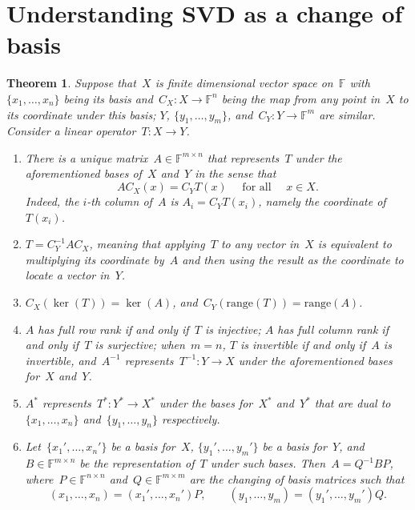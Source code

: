 \documentclass[11pt,a4paper]{article}
\newtheorem{theorem}{Theorem}%
\theoremstyle{definition}
\def\FF{\mathbb{F}}
\newcommand{\sss}[1]{{\scriptscriptstyle{#1}}}
\newcommand{\inv}{{-1}}
\newcommand{\adj}{*}
\newcommand{\range}{\mathrm{range}}
\begin{document}
\section{Understanding SVD as a change of basis}

\begin{theorem}
  \label{th:matrix}
  Suppose that~$X$ is finite dimensional vector space on~$\FF$ with $\{x_1,  \dots,
  x_n\}$ being its basis and~$C_\sss{X} : X \to \FF^{n}$ being the map from any point in~$X$ to its
  coordinate under this basis; $Y$, $\{y_1, \dots, y_m\}$, and~$C_\sss{Y} : Y \to \FF^{m}$ are similar. 
  Consider a linear operator~$T \mathrel{:} X \to Y$.
  \begin{enumerate}[leftmargin=1.5em]
    \item There is a unique matrix~$A\in \FF^{m\times n}$
   that represents~$T$ under the aforementioned bases of~$X$ and~$Y$ in the sense that 
  \begin{equation*}
    A C_\sss{X} (x) = C_\sss{Y} T (x) \quad \text{ for all } \quad x\in X.
  \end{equation*}
  Indeed, the $i$-th column of~$A$ is $A_i = C_\sss{Y}T(x_i)$, namely the coordinate of~$T(x_i)$. 
\item $T = C_\sss{Y}^\inv A C_\sss{X}$, meaning that applying~$T$ to any vector in~$X$ is equivalent to
  multiplying its coordinate by~$A$ and then using the result as the coordinate to locate a vector in~$Y$.  
\item $C_\sss{X}(\ker(T)) = \ker(A)$, and~$C_\sss{Y} (\range(T)) = \range(A)$.
\item $A$ has full row rank if and only if~$T$ is injective; $A$ has full column rank if and only
  if~$T$ is surjective;
  when~$m=n$, $T$ is invertible if and only if~$A$ is invertible, and~$A^\inv$
  represents~$T^\inv\mathrel{:} Y\to X$ under the aforementioned bases for~$X$ and~$Y$.
\item $A^\adj$ represents~$T^\adj \mathrel{:} Y^\adj \to X^\adj$ under the bases for~$X^*$ and~$Y^*$
  that are dual to~$\{x_1, \dots, x_n\}$ and~$\{y_1, \dots, y_n\}$ respectively.
\item Let~$\{x_1', \dots, x_n'\}$ be a basis for~$X$, $\{y_1', \dots, y_m'\}$ be a
  basis for~$Y$, and~$B\in \FF^{m\times n}$ be the representation of~$T$ under such bases.
  Then~$A = Q^\inv B P$, where~$P\in \FF^{n\times n}$ and~$Q\in \FF^{m \times m}$ 
  are the changing of basis matrices such that 
  \begin{equation*}
    (x_1, \dots, x_n) = (x_1', \dots, x_n')P, \qquad 
    (y_1, \dots, y_m) = (y_1', \dots, y_m')Q.
  \end{equation*}
  \end{enumerate}
\end{theorem}
\end{document}
